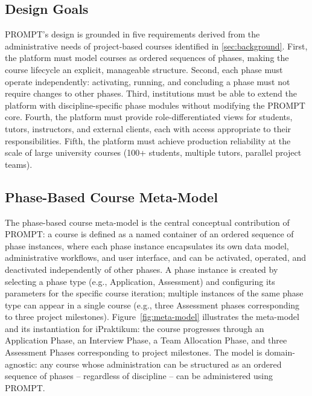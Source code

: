 
\label{sec:prompt}

\subsection{Design Goals}

PROMPT's design is grounded in five requirements derived from the administrative needs of project-based courses identified in \autoref{sec:background}.
First, the platform must model courses as ordered sequences of phases, making the course lifecycle an explicit, manageable structure.
Second, each phase must operate independently: activating, running, and concluding a phase must not require changes to other phases.
Third, institutions must be able to extend the platform with discipline-specific phase modules without modifying the PROMPT core.
Fourth, the platform must provide role-differentiated views for students, tutors, instructors, and external clients, each with access appropriate to their responsibilities.
Fifth, the platform must achieve production reliability at the scale of large university courses (100+ students, multiple tutors, parallel project teams).

\subsection{Phase-Based Course Meta-Model}

The phase-based course meta-model is the central conceptual contribution of PROMPT:
a course is defined as a named container of an ordered sequence of phase instances, where each phase instance encapsulates its own data model, administrative workflows, and user interface, and can be activated, operated, and deactivated independently of other phases.
A phase instance is created by selecting a phase type (e.g., Application, Assessment) and configuring its parameters for the specific course iteration;
multiple instances of the same phase type can appear in a single course (e.g., three Assessment phases corresponding to three project milestones).
Figure~\ref{fig:meta-model} illustrates the meta-model and its instantiation for iPraktikum:
the course progresses through an Application Phase, an Interview Phase, a Team Allocation Phase, and three Assessment Phases corresponding to project milestones.
The model is domain-agnostic:
any course whose administration can be structured as an ordered sequence of phases -- regardless of discipline -- can be administered using PROMPT.

